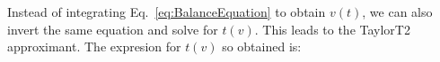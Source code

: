Instead of integrating Eq.~\eqref{eq:BalanceEquation} to obtain $v(t)$, 
we can also invert the same equation and solve for $t(v)$. This leads to the 
TaylorT2 approximant. The expresion for $t(v)$ so obtained is:
